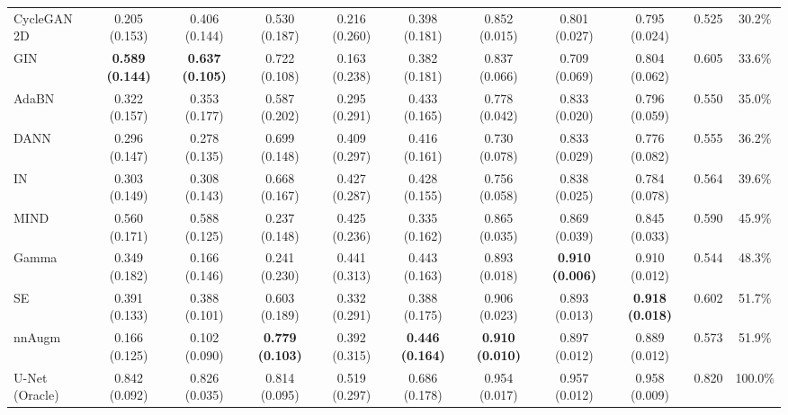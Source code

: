 \begin{table*}
{\begin{tabular}{lcccccccccc}
			CycleGAN 2D \cite{cyclegan} & 0.205 (0.153) & 0.406 (0.144) & 0.530 (0.187) & 0.216 (0.260) & 0.398 (0.181) & 0.852 (0.015) & 0.801 (0.027) & 0.795 (0.024) & 0.525 & 30.2\% \\
			
			GIN \cite{gin} & \textbf{0.589 (0.144)} & \textbf{0.637 (0.105)} & 0.722 (0.108) & 0.163 (0.238) & 0.382 (0.181) & 0.837 (0.066) & 0.709 (0.069) & 0.804 (0.062) & 0.605 & 33.6\% \\
			
			AdaBN \cite{adabn} & 0.322 (0.157) & 0.353 (0.177) & 0.587 (0.202) & 0.295 (0.291) & 0.433 (0.165) & 0.778 (0.042) & 0.833 (0.020) & 0.796 (0.059) & 0.550 & 35.0\% \\
			
			DANN \cite{dann_medim} & 0.296 (0.147) & 0.278 (0.135) & 0.699 (0.148) & 0.409 (0.297) & 0.416 (0.161) & 0.730 (0.078) & 0.833 (0.029) & 0.776 (0.082) & 0.555 & 36.2\% \\
			
			IN \cite{instance_norm} & 0.303 (0.149) & 0.308 (0.143) & 0.668 (0.167) & 0.427 (0.287) & 0.428 (0.155) & 0.756 (0.058) & 0.838 (0.025) & 0.784 (0.078) & 0.564 & 39.6\% \\
			
			MIND \cite{dg_tta} & 0.560 (0.171) & 0.588 (0.125) & 0.237 (0.148) & 0.425 (0.236) & 0.335 (0.162) & 0.865 (0.035) & 0.869 (0.039) & 0.845 (0.033) & 0.590 & 45.9\% \\
			
			Gamma          & 0.349 (0.182) & 0.166 (0.146) & 0.241 (0.230) & 0.441 (0.313) & 0.443 (0.163) & 0.893 (0.018) & \textbf{0.910 (0.006)} & 0.910 (0.012) & 0.544 & 48.3\% \\
			
			SE \cite{se_medim} & 0.391 (0.133) & 0.388 (0.101) & 0.603 (0.189) & 0.332 (0.291) & 0.388 (0.175) & 0.906 (0.023) & 0.893 (0.013) & \textbf{0.918 (0.018)} & 0.602 & 51.7\% \\
			
			nnAugm \cite{nnunet} & 0.166 (0.125) & 0.102 (0.090) & \textbf{0.779 (0.103)} & 0.392 (0.315) & \textbf{0.446 (0.164)} & \textbf{0.910 (0.010)} & 0.897 (0.012) & 0.889 (0.012) & 0.573 & 51.9\% \\
			
			
			
			
			\midrule
			
			U-Net (Oracle)        & 0.842 (0.092) & 0.826 (0.035) & 0.814 (0.095) & 0.519 (0.297) & 0.686 (0.178) & 0.954 (0.017) & 0.957 (0.012) & 0.958 (0.009) & 0.820 & 100.0\% \\
			
			\bottomrule
			
	\end{tabular}}
	\label{tab:metrics_pure}
\end{table*}
